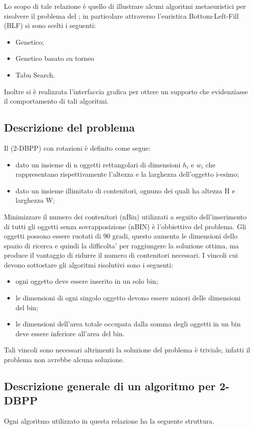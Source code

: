 Lo scopo di tale relazione è quello di illustrare alcuni algoritmi
metaeuristici per risolvere il problema del \ddbp{}; in particolare
attraverso l'euristica Bottom-Left-Fill (BLF) si sono scelti i seguenti:
\begin{itemize}
\item Genetico;
\item Genetico basato su torneo
\item Tabu Search.
\end{itemize}
Inoltre si è realizzata l'interfaccia grafica per ottere un supporto che
evidenziasse il comportamento di tali algoritmi.

\subsection{Descrizione del problema}
Il \ddbpp{} (2-DBPP) con rotazioni è definito come segue:
\begin{itemize}
\item dato un insieme di n oggetti rettangolari di dimensioni $h_{i}$ e $w_{i}$
che rappresentano rispettivamente l'altezza e la larghezza dell’oggetto
i-esimo;
\item dato un insieme illimitato di contenitori, ognuno dei quali ha altezza
H e larghezza W;
\end{itemize}
Minimizzare il numero dei contenitori (nBin) utilizzati a seguito
dell'inserimento di tutti gli oggetti senza sovrapposizione (nBIN) è
l'obbiettivo del problema. Gli oggetti possono essere ruotati di 90 gradi,
questo aumenta le dimensioni dello spazio di ricerca e quindi la difficolta’ per
raggiungere la soluzione ottima, ma produce il vantaggio di ridurre il numero di
contenitori necessari.
I vincoli cui devono sottostare gli algoritmi risolutivi sono i seguenti:
\begin{itemize}
 \item ogni oggetto deve essere inserito in un solo bin;
 \item le dimensioni di ogni singolo oggetto devono essere minori delle
dimensioni del bin;
 \item le dimensioni dell'area totale occupata dalla somma degli oggetti in un
bin deve essere inferiore all'area del bin.
\end{itemize}
Tali vincoli sono necessari altrimenti la soluzione del problema è triviale,
infatti il problema non avrebbe alcuna soluzione.

\subsection{Descrizione generale di un algoritmo per 2-DBPP}
Ogni algoritmo utilizzato in questa relazione ha la seguente struttura.

